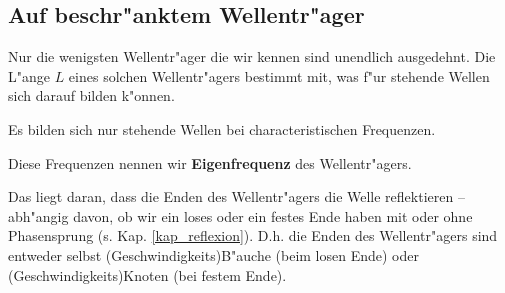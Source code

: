 \subsection{Auf beschr"anktem Wellentr"ager}
\label{kap_auf-beschranktem-wellentrager}

Nur die wenigsten Wellentr"ager die wir kennen sind unendlich
ausgedehnt. Die L"ange $L$ eines solchen Wellentr"agers bestimmt mit,
was f"ur stehende Wellen sich darauf bilden k"onnen.
\begin{Wichtig}
   Es bilden sich nur stehende Wellen bei characteristischen
   Frequenzen.
\end{Wichtig}
\begin{Def}
   Diese Frequenzen nennen wir
   \textbf{Eigenfrequenz} des Wellentr"agers.
\end{Def}
Das liegt daran, dass die Enden des Wellentr"agers die Welle
reflektieren -- abh"angig davon, ob wir ein loses oder ein festes Ende
haben mit oder ohne Phasensprung
(s. Kap. \ref{kap_reflexion}). D.h. die Enden des Wellentr"agers sind
entweder selbst (Geschwindigkeits)B"auche (beim losen Ende) oder
(Geschwindigkeits)Knoten (bei festem Ende).

